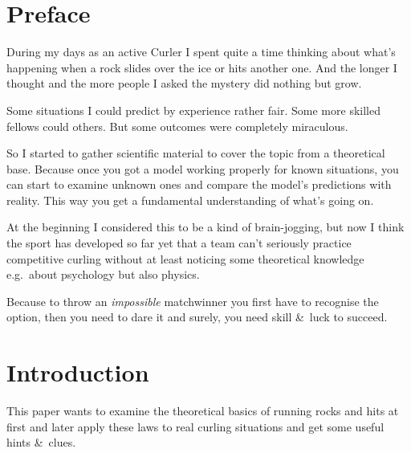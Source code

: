
\chapter*{Preface}

During my days as an active Curler I spent quite a time thinking about
what's happening when a rock slides over the ice or hits another one.
And the longer I thought and the more people I asked the mystery did
nothing but grow.

Some situations I could predict by experience rather fair. Some more
skilled fellows could others. But some outcomes were completely
miraculous.

So I started to gather scientific material to cover the topic
from a theoretical base. Because once you got a model working properly
for known situations, you can start to examine unknown ones and compare
the model's predictions with reality. This way you get a fundamental
understanding of what's going on.

At the beginning I considered this to be a kind of brain-jogging, but now I
think the sport has developed so far yet that a team can't seriously
practice competitive curling without at least noticing some theoretical
knowledge e.g.\ about psychology but also physics.

Because to throw an \emph{impossible} matchwinner you first have to
recognise the option, then you need to dare it and surely, you need skill
\&\ luck to succeed.

\chapter*{Introduction}

This paper wants to examine the theoretical basics of running rocks and hits at
first and later apply these laws to real curling situations and get some useful
hints \&\ clues.
